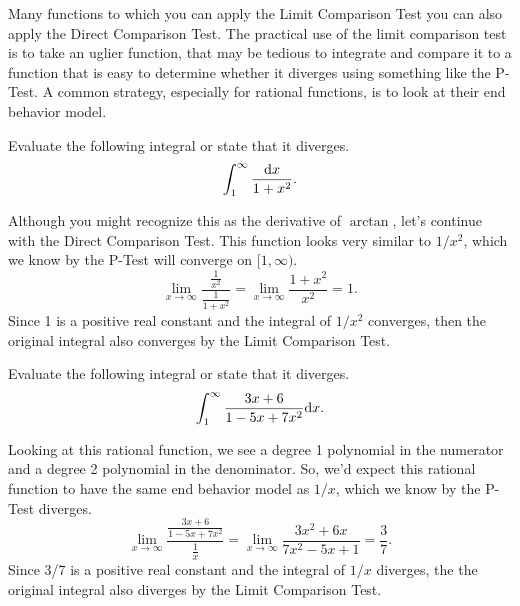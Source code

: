 Many functions to which you can apply the Limit Comparison Test you can also apply the Direct Comparison Test.
The practical use of the limit comparison test is to take an uglier function, that may be tedious to integrate and compare it to a function that is easy to determine whether it diverges using something like the P-Test.
A common strategy, especially for rational functions, is to look at their end behavior model.

\begin{example}
	Evaluate the following integral or state that it diverges.
	\begin{equation*}
		\int_{1}^{\infty}{\frac{\mathrm{d} x}{1+x^2}}.
	\end{equation*}
\end{example}
\begin{answer}
	Although you might recognize this as the derivative of $\arctan$, let's continue with the Direct Comparison Test.
	This function looks very similar to $1/x^2$, which we know by the P-Test will converge on $[1,\infty)$.
	\begin{equation*}
		\lim_{x\to\infty}{\frac{\frac{1}{x^2}}{\frac{1}{1+x^2}}} = \lim_{x\to\infty}{\frac{1+x^2}{x^2}} = 1.
	\end{equation*}
	Since 1 is a positive real constant and the integral of $1/x^2$ converges, then the original integral also converges by the Limit Comparison Test.
\end{answer}

\begin{example}
	Evaluate the following integral or state that it diverges.
	\begin{equation*}
		\int_{1}^{\infty}{\frac{3x+6}{1-5x+7x^2}\mathrm{d} x}.
	\end{equation*}
\end{example}
\begin{answer}
	Looking at this rational function, we see a degree 1 polynomial in the numerator and a degree 2 polynomial in the denominator.
	So, we'd expect this rational function to have the same end behavior model as $1/x$, which we know by the P-Test diverges.
	\begin{equation*}
		\lim_{x\to\infty}{\frac{\frac{3x+6}{1-5x+7x^2}}{\frac{1}{x}}} = \lim_{x\to\infty}{\frac{3x^2+6x}{7x^2-5x+1}} = \frac{3}{7}.
	\end{equation*}
	Since 3/7 is a positive real constant and the integral of $1/x$ diverges, the the original integral also diverges by the Limit Comparison Test.
\end{answer}